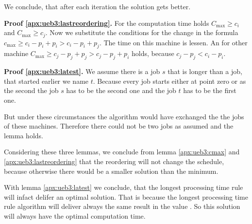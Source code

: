 \documentclass[11pt,a4paper,ngerman]{article}
\begin{document}
\begin{description}
\begin{description}
                We conclude, that after each iteration the solution gets better.
            \item{\bfseries\rmfamily Proof \ref{apx:ueb3:lastreordering}. }
                For the computation time holds $C_{\max}\geq c_i$ and $C_{\max} \geq c_j$.
                Now we substitute the conditions for the change in the
                formula $c_{\max} \geq c_i-p_i + p_i > c_i - p_i + p_j$. The time
                on this machine is lessen. An for other machine
                $C_{\max} \geq c_j-p_j + p_j> c_j - p_j + p_i $ holds, because $c_j-p_j < c_i-p_i$.
            \item{\bfseries\rmfamily Proof \ref{apx:ueb3:latest}. }
                We assume there is a job $s$ that is longer than a job, that started
                earlier we name $t$. Because every job starts either at point zero or as the second
                the job $s$ has to be the second one and the job $t$ has to be the first one.
                
                But under these circumstances the algorithm would have exchanged the
                the jobs of these machines. Therefore there could not be two jobs as assumed
                and the lemma holds.
        \end{description}
        Considering these three lemmas, we conclude from lemma \ref{apx:ueb3:cmax} and 
        \ref{apx:ueb3:lastreordering} that the reordering will not change the schedule, because 
        otherwise there would be a smaller solution than the minimum.

        With lemma \ref{apx:ueb3:latest} we conclude, that the longest processing time rule
        will infact delifer an optimal solution. That is because the longest processing 
        time rule  algorithm will deliver always the same result in the value . 
        So this solution will always have the optimal computation time.
\end{description}

\label{LastPage}
\end{document}
